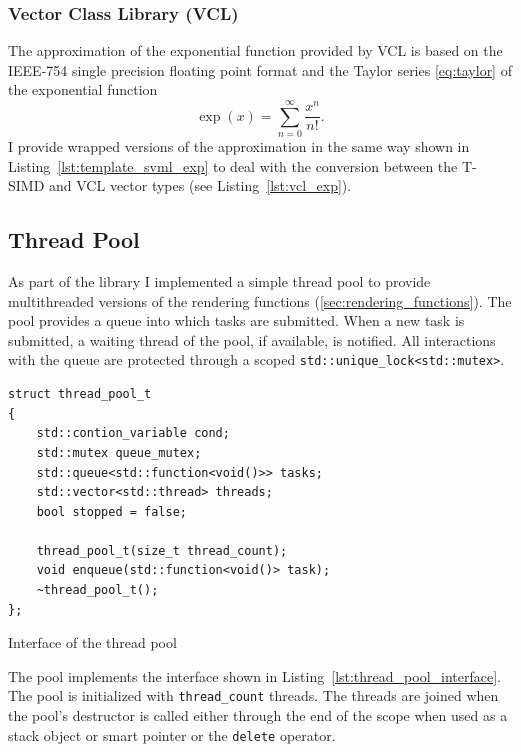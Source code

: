 \documentclass[a4paper, 11pt]{memoir}
\begin{document}
    \subsubsection{Vector Class Library (VCL)}
    \label{sec:vcl}
    The approximation of the exponential function provided by VCL is based on the IEEE-754 single precision floating
    point format and the Taylor series \eqref{eq:taylor} of the exponential function
    \begin{equation}
        \exp{(x)} = \sum_{n = 0}^\infty \frac{x^n}{n!}.
    \end{equation}
    I provide wrapped versions of the approximation in
    the same way shown in Listing~\ref{lst:template_svml_exp} to deal with the conversion between the T-SIMD and VCL
    vector types (see Listing~\ref{lst:vcl_exp}).

    \subsection{Thread Pool}
    \label{sec:thread_pool}
    As part of the library I implemented a simple thread pool to provide multithreaded versions of the rendering
    functions (\ref{sec:rendering_functions}). The pool provides a queue into which tasks are submitted. When a new task
    is submitted, a waiting thread of the pool, if available, is notified. All interactions with the queue are protected
    through a scoped \texttt{std::unique_lock<std::mutex>}.

    \begin{listing}[t]
        \begin{verbatim}
struct thread_pool_t
{
    std::contion_variable cond;
    std::mutex queue_mutex;
    std::queue<std::function<void()>> tasks;
    std::vector<std::thread> threads;
    bool stopped = false;

    thread_pool_t(size_t thread_count);
    void enqueue(std::function<void()> task);
    ~thread_pool_t();
};
        \end{verbatim}
        \caption{Interface of the thread pool}
        \label{lst:thread_pool_interface}
    \end{listing}

    The pool implements the interface shown in Listing~\ref{lst:thread_pool_interface}.
    The pool is initialized with \texttt{thread_count} threads. The threads are joined when the pool's
    destructor is called either through the end of the scope when used as a stack object or smart pointer or the
    \texttt{delete} operator.
\end{document}
